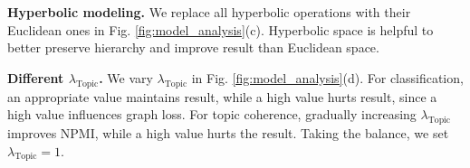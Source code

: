 \textbf{Hyperbolic modeling.} %
We replace all hyperbolic operations with their Euclidean ones in Fig. \ref{fig:model_analysis}(c). Hyperbolic space is helpful to better preserve hierarchy and improve result than Euclidean space.

\textbf{Different $ \lambda_{\text{Topic}} $.} We vary $ \lambda_{\text{Topic}} $ in Fig. \ref{fig:model_analysis}(d). For classification, an appropriate value maintains result, while a high value hurts result, since a high value influences graph loss. For topic coherence, gradually increasing $ \lambda_{\text{Topic}} $ improves NPMI, %
while a high value hurts the result. Taking the balance, we set $ \lambda_{\text{Topic}}=1 $.

